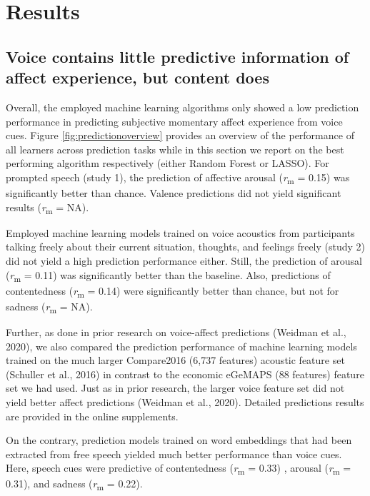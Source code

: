 \documentclass[
  english,
  man,floatsintext]{apa6}
\begin{document}
\hypertarget{results}{%
\section{Results}\label{results}}

\hypertarget{voice-contains-little-predictive-information-of-affect-experience-but-content-does}{%
\subsection{Voice contains little predictive information of affect experience, but content does}\label{voice-contains-little-predictive-information-of-affect-experience-but-content-does}}

Overall, the employed machine learning algorithms only showed a low prediction performance in predicting subjective momentary affect experience from voice cues. Figure \ref{fig:predictionoverview} provides an overview of the performance of all learners across prediction tasks while in this section we report on the best performing algorithm respectively (either Random Forest or LASSO).
For prompted speech (study 1), the prediction of affective arousal (\emph{r}\textsubscript{m} = 0.15) was significantly better than chance. Valence predictions did not yield significant results (\emph{r}\textsubscript{m} = NA).

Employed machine learning models trained on voice acoustics from participants talking freely about their current situation, thoughts, and feelings freely (study 2) did not yield a high prediction performance either. Still, the prediction of arousal (\emph{r}\textsubscript{m} = 0.11) was significantly better than the baseline. Also, predictions of contentedness (\emph{r}\textsubscript{m} = 0.14) were significantly better than chance, but not for sadness (\emph{r}\textsubscript{m} = NA).

Further, as done in prior research on voice-affect predictions (Weidman et al., 2020), we also compared the prediction performance of machine learning models trained on the much larger Compare2016 (6,737 features) acoustic feature set (Schuller et al., 2016) in contrast to the economic eGeMAPS (88 features) feature set we had used. Just as in prior research, the larger voice feature set did not yield better affect predictions (Weidman et al., 2020). Detailed predictions results are provided in the online supplements.

On the contrary, prediction models trained on word embeddings that had been extracted from free speech yielded much better performance than voice cues. Here, speech cues were predictive of contentedness (\emph{r}\textsubscript{m} = 0.33) , arousal (\emph{r}\textsubscript{m} = 0.31), and sadness (\emph{r}\textsubscript{m} = 0.22).
\end{document}
